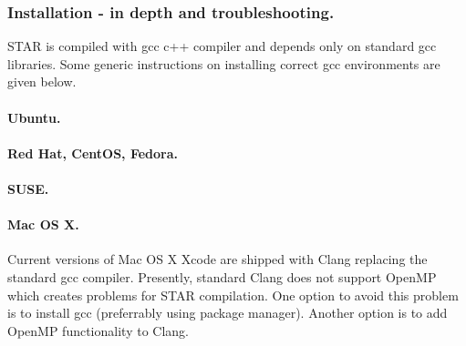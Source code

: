 \documentclass[12pt]{article}
\begin{document}
\subsubsection{Installation - in depth and troubleshooting.}
STAR is compiled with gcc c++ compiler and depends only on standard gcc libraries. Some generic instructions on installing correct gcc environments are given below.

\paragraph{Ubuntu.}\hfill
{}

\paragraph{Red Hat, CentOS, Fedora.}\hfill
{}
   
\paragraph{SUSE.}\hfill
{}

\paragraph{Mac OS X.\newline}
Current versions of Mac OS X Xcode are shipped with Clang replacing the standard gcc compiler. Presently, standard Clang does not support OpenMP which creates problems for STAR compilation. One option to avoid this problem is to install gcc (preferrably using  package manager). Another option is to add OpenMP functionality to Clang.
\end{document}

